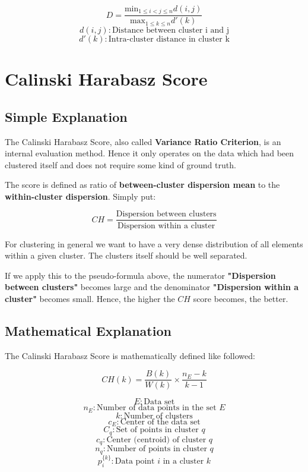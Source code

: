 $$ D = \frac{ \text{min}_{1\leq i < j\leq n} d(i,j) }{ \text{max}_{1 \leq k \leq n} d'(k) } $$
$$ d(i,j) : \text{Distance between cluster i and j}$$
$$d'(k) : \text{Intra-cluster distance in cluster k}$$


\clearpage
\section{Calinski Harabasz Score}
\subsection{Simple Explanation}


The Calinski Harabasz Score, also called \textbf{Variance Ratio Criterion}, is an internal evaluation method. Hence it only operates on the data which had been clustered itself and does not require some kind of ground truth. 


The score is defined as ratio of \textbf{between-cluster dispersion mean} to the \textbf{within-cluster dispersion}.
Simply put:

$$ CH = \frac{\text{Dispersion between clusters}}{\text{Dispersion within a cluster}}  $$

For clustering in general we want to have a very dense distribution of all elements within a given cluster. The clusters itself should be well separated.

If we apply this to the pseudo-formula above, the numerator \textbf{"Dispersion between clusters"} becomes large and the denominator \textbf{"Dispersion within a cluster"} becomes small. Hence, the higher the $CH$ score becomes, the better. 



\clearpage
\subsection{Mathematical Explanation}

The Calinski Harabasz Score is mathematically defined like followed:


$$ CH(k) = \frac{B(k)}{W(k)} \times \frac{n_{E} - k}{k - 1} $$

$$ E : \text{Data set} $$
$$ n_{E} : \text{Number of data points in the set } E $$
$$ k : \text{Number of clusters} $$
$$ c_{E} : \text{Center of the data set} $$
$$ C_{q} : \text{Set of points in cluster } q $$
$$ c_{q} : \text{Center (centroid) of cluster } q $$
$$ n_{q} : \text{Number of points in cluster } q $$
$$p_{i}^{\{k\}} : \text{Data point } i \text{ in a cluster } k $$


